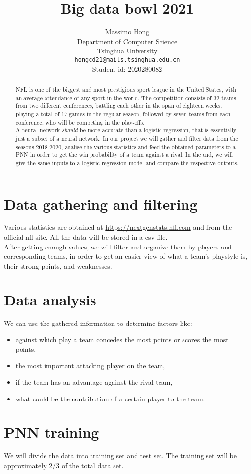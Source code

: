 \documentclass{article}
\title{Big data bowl 2021}
\author{
  Massimo Hong\\
  Department of Computer Science\\
  Tsinghua University\\
  \texttt{hongcd21@mails.tsinghua.edu.cn} \\
  Student id: 2020280082}
\begin{document}
\maketitle

\begin{abstract}
  NFL is one of the biggest and most prestigious sport league in the United States, with an average attendance of any sport in the world. The competition consists of 32 teams from two different conferences, battling each other in the span of eighteen weeks, playing a total of 17 games in the regular season, followed by seven teams from each conference, who will be competing in the play-offs.\\
A neural network \textit{should} be more accurate than a logistic regression, that is essentially just a subset of a neural network. 
In our project we will gather and filter data from the seasons 2018-2020, analise the various statistics and feed the obtained parameters to a PNN in order to get the win probability of a team against a rival. In the end, we will give the same inputs to a logistic regression model and compare the respective outputs.
\end{abstract}

\section{Data gathering and filtering}
Various statistics are obtained at \url{https://nextgenstats.nfl.com} and from the official nfl site. All the data will be stored in a csv file.\\ After getting enough values, we will filter and organize them by players and corresponding teams, in order to get an easier view of 
what a team's playstyle is, their strong points, and weaknesses.
\section{Data analysis}
We can use the gathered information to determine factors like:
\begin{itemize}
\item against which play a team concedes the most points or scores the most points, 
\item the most important attacking player on the team,
\item if the team has an advantage against the rival team,
\item what could be the contribution of a certain player to the team.
\end{itemize}

\section{PNN training}
We will divide the data into training set and test set. The training set will be approximately 2/3 of the total data set.  
\end{document}
